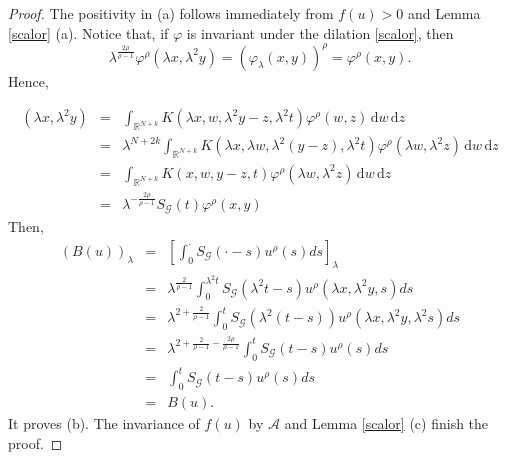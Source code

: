 \documentclass[10pt,a4paper]{amsart}
\newcommand{\di}{\, \mathrm{d}}
\begin{document}
\begin{proof}
	The positivity in (a) follows immediately from $f(u)>0$ and Lemma \ref{scalor} (a).
	Notice that, if $\varphi$ is invariant under the dilation \eqref{scalor}, then
	\begin{equation}\label{homop}
		\lambda^{\frac{2\rho}{\rho-1}} \varphi^{\rho}(\lambda x,\lambda^2y) = (\varphi_{\lambda}(x,y))^\rho = \varphi^\rho(x,y) .
	\end{equation}
	Hence,
	
	\begin{eqnarray*}
		[S_\mathcal{G}(\lambda^2t)\varphi^{\rho}](\lambda x, \lambda^2y) & = &   \int_{\mathbb{R}^{N+k}} K(\lambda x,w,\lambda^2y-z,\lambda^2t) \varphi^{\rho}(w,z) \di w \di z\\
		&=& \lambda^{ N +2k } \int_{\mathbb{R}^{N+k}} K(\lambda x, \lambda w,\lambda^2 (y-z),\lambda^2t) \varphi^{\rho}(\lambda w, \lambda^2 z) \di w \di z\\
		&=&  \int_{\mathbb{R}^{N+k}} K( x,  w, y-z,t) \varphi^{\rho}(\lambda w, \lambda^2 z) \di w \di z\\
		&=& \lambda^{ - \frac{2\rho}{\rho-1}} S_\mathcal{G}(t)\varphi^{\rho}(x,y)
	\end{eqnarray*}
	Then,
	\begin{eqnarray*}
		(B(u))_\lambda &=& \left[ \int^{\cdot}_0S_\mathcal{G}(\cdot-s)u^{\rho}(s)ds\right]_{\lambda} \\
		&=& \lambda^{\frac{2}{\rho-1}}\int^{\lambda^2t}_0S_\mathcal{G}(\lambda^2t-s)u^{\rho}(\lambda x, \lambda^2y, s) ds\\
		&=&\lambda^{2+\frac{2}{\rho-1}} \int^t_0 S_\mathcal{G}(\lambda^2(t-s)) u^{\rho}(\lambda x,\lambda^2y, \lambda^2s)ds\\
		&=&\lambda^{2+\frac{2}{\rho-1}- \frac{2\rho}{\rho-1}} \int^t_0S_\mathcal{G}(t-s)u^{\rho}(s)ds\\
		&=&\int^t_0S_\mathcal{G}(t-s)u^{\rho}(s)ds \\
		&=& B(u).
	\end{eqnarray*}
	It proves (b). The invariance of $f(u)$ by $\mathcal{A}$ and Lemma \ref{scalor} (c) finish the proof.
\end{proof}
\end{document}
